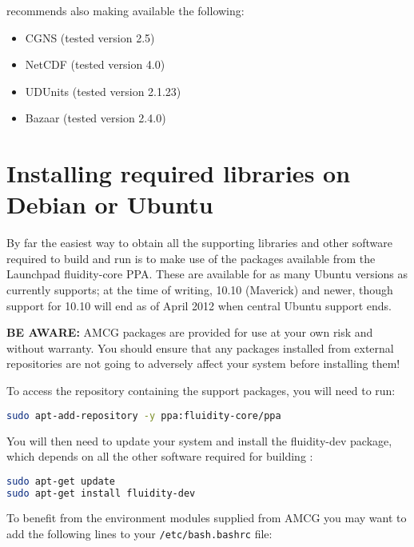 \fluidity recommends also making available the following:

\begin{itemize}
\item CGNS (tested version 2.5)
\item NetCDF (tested version 4.0)
\item UDUnits (tested version 2.1.23)
\item Bazaar (tested version 2.4.0)
\end{itemize}

\section{Installing required libraries on Debian or Ubuntu}
\label{sec:required_ḻibraries_debian}

By far the easiest way to obtain all the supporting libraries and other
software required to build and run \fluidity is to make use of the \fluidity
packages available from the Launchpad fluidity-core PPA. These are available
for as many Ubuntu versions as \fluidity currently supports; at the time of
writing, 10.10 (Maverick) and newer, though support for 10.10 will end as of
April 2012 when central Ubuntu support ends.

\textbf{BE AWARE:} AMCG packages are provided for use at your own risk and
without warranty. You should ensure that any packages installed from external
repositories are not going to adversely affect your system before installing
them!

To access the repository containing the \fluidity support packages, you will
need to run:

\begin{lstlisting}[language=bash]
sudo apt-add-repository -y ppa:fluidity-core/ppa
\end{lstlisting}

You will then need to update your system and install the fluidity-dev package,
which depends on all the other software required for building \fluidity:

\begin{lstlisting}[language=bash]
sudo apt-get update
sudo apt-get install fluidity-dev
\end{lstlisting}

To benefit from the environment modules supplied from AMCG you may want to add
the following lines to your \lstinline[language=bash]+/etc/bash.bashrc+ file:

